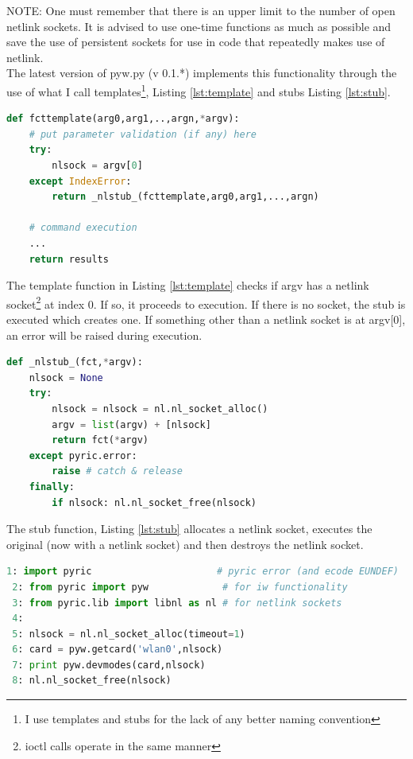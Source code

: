 \documentclass[11pt]{article}
\begin{document}
NOTE: One must remember that there is an upper limit to the number of open netlink
sockets. It is advised to use one-time functions as much as possible and save the
use of persistent sockets for use in code that repeatedly makes use of netlink. \\

The latest version of pyw.py (v 0.1.*) implements this functionality through the 
use of what I call templates\footnote{I use templates and stubs for the lack
of any better naming convention}, Listing \ref{lst:template} and stubs Listing 
\ref{lst:stub}.

\begin{lstlisting}[caption={A Basic Netlink Function Template},
                   label={lst:template},
                   language=Python]
def fcttemplate(arg0,arg1,..,argn,*argv):
    # put parameter validation (if any) here
    try:
        nlsock = argv[0]
    except IndexError:
        return _nlstub_(fcttemplate,arg0,arg1,...,argn)
        
    # command execution
    ...
    return results
\end{lstlisting}

The template function in Listing \ref{lst:template} checks if argv has a netlink
socket\footnote{ioctl calls operate in the same manner} at index 0. If so, it
proceeds to execution. If there is no socket, the stub is executed which creates 
one. If something other than a netlink socket is at argv[0], an error will be 
raised during execution. \\

\begin{lstlisting}[caption={Function \_nlstub\_},
                   label={lst:stub},
                   language=Python]
def _nlstub_(fct,*argv):
    nlsock = None
    try:
        nlsock = nlsock = nl.nl_socket_alloc()
        argv = list(argv) + [nlsock]
        return fct(*argv)
    except pyric.error: 
        raise # catch & release
    finally:
        if nlsock: nl.nl_socket_free(nlsock)
\end{lstlisting}

The stub function, Listing \ref{lst:stub} allocates a netlink socket, executes
the original (now with a netlink socket) and then destroys the netlink socket.\\

\begin{lstlisting}[caption={Using Persistent Sockets},
                   label={lst:persistent},
                   language=Python]
 1: import pyric                      # pyric error (and ecode EUNDEF)
 2: from pyric import pyw             # for iw functionality
 3: from pyric.lib import libnl as nl # for netlink sockets
 4:
 5: nlsock = nl.nl_socket_alloc(timeout=1)
 6: card = pyw.getcard('wlan0',nlsock)
 7: print pyw.devmodes(card,nlsock)
 8: nl.nl_socket_free(nlsock)
\end{lstlisting}
\end{document}

